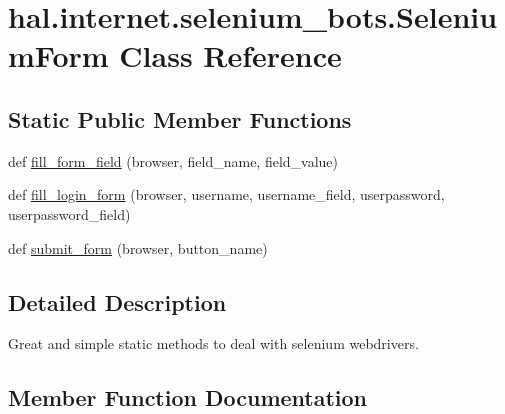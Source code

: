 \hypertarget{classhal_1_1internet_1_1selenium__bots_1_1_selenium_form}{}\section{hal.\+internet.\+selenium\+\_\+bots.\+Selenium\+Form Class Reference}
\label{classhal_1_1internet_1_1selenium__bots_1_1_selenium_form}
\subsection*{Static Public Member Functions}
\begin{DoxyCompactItemize}
\item 
def \hyperlink{classhal_1_1internet_1_1selenium__bots_1_1_selenium_form_ac5b407648f6f5fd8ae374114f1249b06}{fill\+\_\+form\+\_\+field} (browser, field\+\_\+name, field\+\_\+value)
\item 
def \hyperlink{classhal_1_1internet_1_1selenium__bots_1_1_selenium_form_af52a0e740729cec36aa8c3f839320366}{fill\+\_\+login\+\_\+form} (browser, username, username\+\_\+field, userpassword, userpassword\+\_\+field)
\item 
def \hyperlink{classhal_1_1internet_1_1selenium__bots_1_1_selenium_form_a4573be4686c58856ee6244926e45f7d9}{submit\+\_\+form} (browser, button\+\_\+name)
\end{DoxyCompactItemize}


\subsection{Detailed Description}
\begin{DoxyVerb}Great and simple static methods to deal with selenium webdrivers. \end{DoxyVerb}
 

\subsection{Member Function Documentation}
